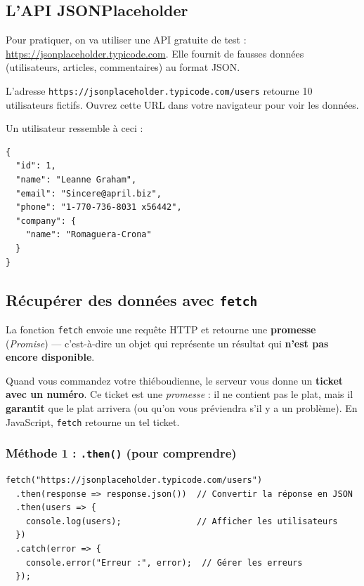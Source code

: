 \documentclass[11pt,a4paper]{article}
\begin{document}
\subsection{L'API JSONPlaceholder}

Pour pratiquer, on va utiliser une API gratuite de test : \url{https://jsonplaceholder.typicode.com}. Elle fournit de fausses données (utilisateurs, articles, commentaires) au format JSON.

L'adresse \texttt{https://jsonplaceholder.typicode.com/users} retourne 10 utilisateurs fictifs. Ouvrez cette URL dans votre navigateur pour voir les données.

Un utilisateur ressemble à ceci :

\begin{lstlisting}
{
  "id": 1,
  "name": "Leanne Graham",
  "email": "Sincere@april.biz",
  "phone": "1-770-736-8031 x56442",
  "company": {
    "name": "Romaguera-Crona"
  }
}
\end{lstlisting}

\subsection{Récupérer des données avec \texttt{fetch}}

La fonction \texttt{fetch} envoie une requête HTTP et retourne une \textbf{promesse} (\emph{Promise}) --- c'est-à-dire un objet qui représente un résultat qui \textbf{n'est pas encore disponible}.

\begin{infobox}
Quand vous commandez votre thiéboudienne, le serveur vous donne un \textbf{ticket avec un numéro}. Ce ticket est une \emph{promesse} : il ne contient pas le plat, mais il \textbf{garantit} que le plat arrivera (ou qu'on vous préviendra s'il y a un problème). En JavaScript, \texttt{fetch} retourne un tel ticket.
\end{infobox}

\subsubsection{Méthode 1 : \texttt{.then()} (pour comprendre)}

\begin{lstlisting}
fetch("https://jsonplaceholder.typicode.com/users")
  .then(response => response.json())  // Convertir la réponse en JSON
  .then(users => {
    console.log(users);               // Afficher les utilisateurs
  })
  .catch(error => {
    console.error("Erreur :", error);  // Gérer les erreurs
  });
\end{lstlisting}
\end{document}
